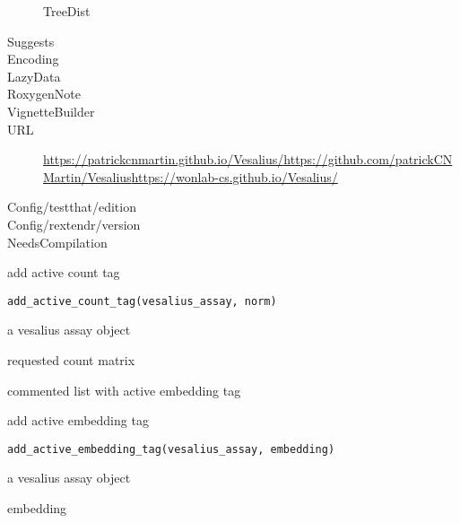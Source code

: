 \documentclass[a4paper]{book}
\begin{document}
\begin{description}
{TreeDist}
\item[Suggests]
\item[Encoding]
\item[LazyData]
\item[RoxygenNote]
\item[VignetteBuilder]
\item[URL]\AsIs{}\url{https://patrickcnmartin.github.io/Vesalius/}\AsIs{,
}\url{https://github.com/patrickCNMartin/Vesalius}\AsIs{,
}\url{https://wonlab-cs.github.io/Vesalius/}\AsIs{}
\item[Config/testthat/edition]
\item[Config/rextendr/version]
\item[NeedsCompilation]
\end{description}
%
\begin{Description}
add active count tag
\end{Description}
%
\begin{Usage}
\begin{verbatim}
add_active_count_tag(vesalius_assay, norm)
\end{verbatim}
\end{Usage}
%
\begin{Arguments}
\begin{ldescription}
\item[\code{vesalius\_assay}] a vesalius assay object

\item[\code{norm}] requested count matrix
\end{ldescription}
\end{Arguments}
%
\begin{Value}
commented list with active embedding tag
\end{Value}
%
\begin{Description}
add active embedding tag
\end{Description}
%
\begin{Usage}
\begin{verbatim}
add_active_embedding_tag(vesalius_assay, embedding)
\end{verbatim}
\end{Usage}
%
\begin{Arguments}
\begin{ldescription}
\item[\code{vesalius\_assay}] a vesalius assay object

\item[\code{embedding}] embedding
\end{ldescription}
\end{Arguments}
\end{document}
